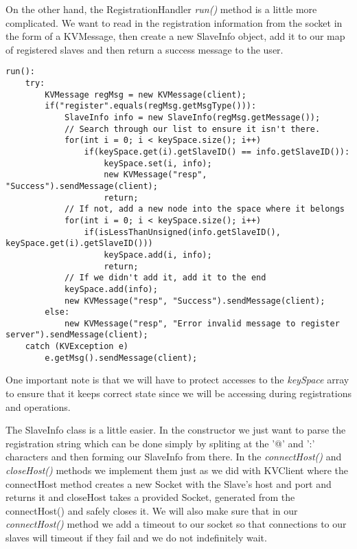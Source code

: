 \documentclass{article}
\begin{document}
On the other hand, the RegistrationHandler \textit{run()} method is a little more complicated. We want to read in the
registration information from the socket in the form of a KVMessage, then create a new SlaveInfo object, add it to our
map of registered slaves and then return a success message to the user.
\begin{verbatim}
run():
    try:
        KVMessage regMsg = new KVMessage(client);
        if("register".equals(regMsg.getMsgType())):
            SlaveInfo info = new SlaveInfo(regMsg.getMessage());
            // Search through our list to ensure it isn't there.
            for(int i = 0; i < keySpace.size(); i++)
                if(keySpace.get(i).getSlaveID() == info.getSlaveID()):
                    keySpace.set(i, info);
                    new KVMessage("resp", "Success").sendMessage(client);
                    return;
            // If not, add a new node into the space where it belongs
            for(int i = 0; i < keySpace.size(); i++)
                if(isLessThanUnsigned(info.getSlaveID(), keySpace.get(i).getSlaveID()))
                    keySpace.add(i, info);
                    return;
            // If we didn't add it, add it to the end
            keySpace.add(info);
            new KVMessage("resp", "Success").sendMessage(client);
        else:
            new KVMessage("resp", "Error invalid message to register server").sendMessage(client);
    catch (KVException e)
        e.getMsg().sendMessage(client);
\end{verbatim}
One important note is that we will have to protect accesses to the \textit{keySpace} array to ensure
that it keeps correct state since we will be accessing during registrations and operations.

The SlaveInfo class is a little easier. In the constructor we just want to parse the registration string which can be
done simply by spliting at the '@' and ':' characters and then forming our SlaveInfo from there. In the
\textit{connectHost()} and \textit{closeHost()} methods we implement them just as we did with KVClient where the
connectHost method creates a new Socket with the Slave's host and port and returns it and closeHost takes a provided
Socket, generated from the connectHost() and safely closes it. We will also make sure that in our \textit{connectHost()}
method we add a timeout to our socket so that connections to our slaves will timeout if they fail and we do not
indefinitely wait.
\end{document}
